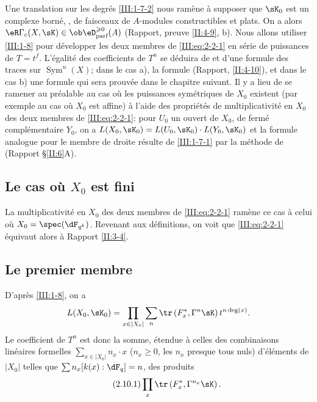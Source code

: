 Une translation sur les degrés \ref{III:1-7-2} nous ramène à supposer 
que $\sK_0$ est un complexe borné, , de faisceaux de 
$A$-modules constructibles et plats. On a alors 
$\eR\Gamma_c(X,\sK)\in \ob\eD_\text{parf}^{\geqslant 0}(A)$ (Rapport, 
preuve \ref{II:4-9}, b). Nous allons utiliser \ref{III:1-8} pour développer 
les deux membres de \eqref{III:eq:2-2-1} en série de puissances de $T=t^f$. 
L'égalité des coefficients de $T^n$ se déduira de 
 et d'une formule des traces sur 
$\operatorname{Sym}^n(X)$; dans le cas a), la formule (Rapport, 
\ref{II:4-10}), et dans le cas b) une formule qui sera prouvée dans le 
chapitre suivant. Il y a lieu de se ramener au préalable au cas où les 
puissances symétriques de $X_0$ existent (par exemple au cas où $X_0$ est 
affine) à l'aide des propriétés de multiplicativité en $X_0$ des deux 
membres de \eqref{III:eq:2-2-1}: pour $U_0$ un ouvert de $X_0$, de fermé 
complémentaire $Y_0$, on a $L(X_0,\sK_0)=L(U_0,\sK_0)\cdot L(Y_0,\sK_0)$ et 
la formule analogue pour le membre de droite résulte de \ref{III:1-7-1} 
par la méthode de (Rapport \S\ref{II:6}A). 





\subsection{Le cas où $X_0$ est fini}\label{III:2-9}

La multiplicativité en $X_0$ des deux membres de \eqref{III:eq:2-2-1} 
ramène ce cas à celui où $X_0=\spec(\dF_{q^k})$. Revenant aux 
définitions, on voit que \eqref{III:eq:2-2-1} équivaut alors à 
Rapport \ref{II:3-4}. 





\subsection{Le premier membre}\label{III:2-10}

D'après \ref{III:1-8}, on a 
\[
  L(X_0,\sK_0) = \prod_{x\in |X_0|} \sum_n \tr\left(F_x^*,\Gamma^n\sK\right) t^{n\deg(x)} \text{.}
\]
Le coefficient de $T^n$ est donc la somme, étendue à celles des 
combinaisons linéaires formelles $\sum_{x\in |X_0|} n_x\cdot x$ 
($n_x\geqslant 0$, les $n_x$ presque tous nuls) d'éléments de $|X_0|$ 
telles que $\sum n_x [k(x):\dF_q] = n$, des produits 
\begin{equation*}\tag{2.10.1}\label{III:eq:2-10-1}
  \prod_x \tr\left(F_x^*,\Gamma^{n_x} \sK\right) \text{.}
\end{equation*}

